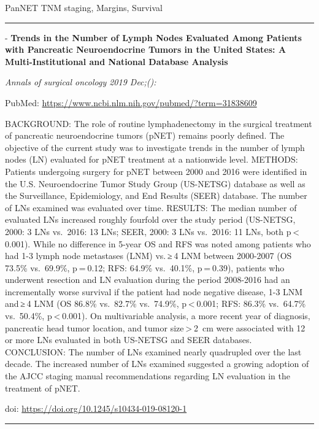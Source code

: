 \documentclass[
]{article}
\renewcommand{\linethickness}{0.05em}
\begin{document}
PanNET TNM staging, Margins, Survival

\begin{center}\rule{0.5\linewidth}{\linethickness}\end{center}

- \textbf{Trends in the Number of Lymph Nodes Evaluated Among Patients
with Pancreatic Neuroendocrine Tumors in the United States: A
Multi-Institutional and National Database Analysis}

\emph{Annals of surgical oncology 2019 Dec;():}

PubMed: \url{https://www.ncbi.nlm.nih.gov/pubmed/?term=31838609}

BACKGROUND: The role of routine lymphadenectomy in the surgical
treatment of pancreatic neuroendocrine tumors (pNET) remains poorly
defined. The objective of the current study was to investigate trends in
the number of lymph nodes (LN) evaluated for pNET treatment at a
nationwide level. METHODS: Patients undergoing surgery for pNET between
2000 and 2016 were identified in the U.S. Neuroendocrine Tumor Study
Group (US-NETSG) database as well as the Surveillance, Epidemiology, and
End Results (SEER) database. The number of LNs examined was evaluated
over time. RESULTS: The median number of evaluated LNs increased roughly
fourfold over the study period (US-NETSG, 2000: 3 LNs vs.~2016: 13 LNs;
SEER, 2000: 3 LNs vs.~2016: 11 LNs, both p \textless{} 0.001). While no
difference in 5-year OS and RFS was noted among patients who had 1-3
lymph node metastases (LNM) vs. ≥ 4 LNM between 2000-2007 (OS 73.5\%
vs.~69.9\%, p = 0.12; RFS: 64.9\% vs.~40.1\%, p = 0.39), patients who
underwent resection and LN evaluation during the period 2008-2016 had an
incrementally worse survival if the patient had node negative disease,
1-3 LNM and ≥ 4 LNM (OS 86.8\% vs.~82.7\% vs.~74.9\%,
p \textless{} 0.001; RFS: 86.3\% vs.~64.7\% vs.~50.4\%,
p \textless{} 0.001). On multivariable analysis, a more recent year of
diagnosis, pancreatic head tumor location, and tumor
size \textgreater{} 2~cm were associated with 12 or more LNs evaluated
in both US-NETSG and SEER databases. CONCLUSION: The number of LNs
examined nearly quadrupled over the last decade. The increased number of
LNs examined suggested a growing adoption of the AJCC staging manual
recommendations regarding LN evaluation in the treatment of pNET.

doi: \url{https://doi.org/10.1245/s10434-019-08120-1}

\begin{center}\rule{0.5\linewidth}{\linethickness}\end{center}
\end{document}
